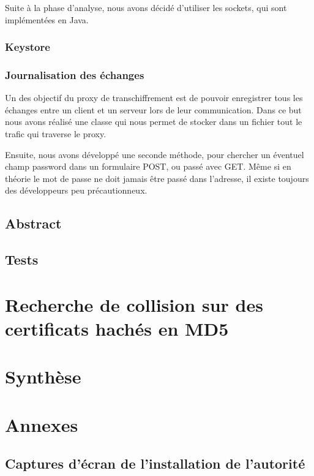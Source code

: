 \documentclass[a4paper,11pt,french]{report}
\begin{document}
Suite à la phase d'analyse, nous avons décidé d'utiliser les sockets, qui sont implémentées en Java.

\subsection{Keystore}


\subsection{Journalisation des échanges}
Un des objectif du proxy de transchiffrement est de pouvoir enregistrer tous les 
échanges entre un client et un serveur lors de leur communication. Dans ce but nous
avons réalisé une classe qui nous permet de stocker dans un fichier tout le trafic qui traverse le proxy.

Ensuite, nous avons développé une seconde méthode, pour chercher un éventuel champ password
dans un formulaire POST, ou passé avec GET. Même si en théorie le mot de passe ne doit jamais
être passé dans l'adresse, il existe toujours des développeurs peu précautionneux.
\section{Abstract}


\section{Tests}

\chapter{Recherche de collision sur des certificats hachés en MD5}

\chapter{Synthèse}

\chapter{Annexes}

\section{Captures d'écran de l'installation de l'autorité}
\end{document}
